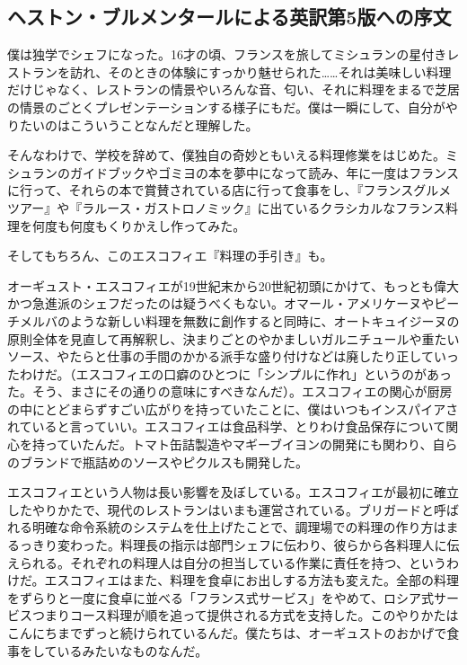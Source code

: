 \setlength{\parindent}{1\zw}

\begin{Main}

\hypertarget{preface-heston-blumenthal}{%
\section{ヘストン・ブルメンタールによる英訳第5版への序文}\label{preface-heston-blumenthal}}

\vspace{1\zw}

僕は独学でシェフになった。16才の頃、フランスを旅してミシュランの星付きレストランを訪れ、そのときの体験にすっかり魅せられた\ldots{}\ldots{}それは美味しい料理だけじゃなく、レストランの情景やいろんな音、匂い、それに料理をまるで芝居の情景のごとくプレゼンテーションする様子にもだ。僕は一瞬にして、自分がやりたいのはこういうことなんだと理解した。

そんなわけで、学校を辞めて、僕独自の奇妙ともいえる料理修業をはじめた。ミシュランのガイドブックやゴミヨの本を夢中になって読み、年に一度はフランスに行って、それらの本で賞賛されている店に行って食事をし、『フランスグルメツアー』や『ラルース・ガストロノミック』に出ているクラシカルなフランス料理を何度も何度もくりかえし作ってみた。

そしてもちろん、このエスコフィエ『料理の手引き』も。

オーギュスト・エスコフィエが19世紀末から20世紀初頭にかけて、もっとも偉大かつ急進派のシェフだったのは疑うべくもない。オマール・アメリケーヌやピーチメルバのような新しい料理を無数に創作すると同時に、オートキュイジーヌの原則全体を見直して再解釈し、決まりごとのやかましいガルニチュールや重たいソース、やたらと仕事の手間のかかる派手な盛り付けなどは廃したり正していったわけだ。（エスコフィエの口癖のひとつに「シンプルに作れ」というのがあった。そう、まさにその通りの意味にすべきなんだ）。エスコフィエの関心が厨房の中にとどまらずすごい広がりを持っていたことに、僕はいつもインスパイアされていると言っていい。エスコフィエは食品科学、とりわけ食品保存について関心を持っていたんだ。トマト缶詰製造やマギーブイヨンの開発にも関わり、自らのブランドで瓶詰めのソースやピクルスも開発した。

エスコフィエという人物は長い影響を及ぼしている。エスコフィエが最初に確立したやりかたで、現代のレストランはいまも運営されている。ブリガードと呼ばれる明確な命令系統のシステムを仕上げたことで、調理場での料理の作り方はまるっきり変わった。料理長の指示は部門シェフに伝わり、彼らから各料理人に伝えられる。それぞれの料理人は自分の担当している作業に責任を持つ、というわけだ。エスコフィエはまた、料理を食卓にお出しする方法も変えた。全部の料理をずらりと一度に食卓に並べる「フランス式サービス」をやめて、ロシア式サービスつまりコース料理が順を追って提供される方式を支持した。このやりかたはこんにちまでずっと続けられているんだ。僕たちは、オーギュストのおかげで食事をしているみたいなものなんだ。


\end{Main}

